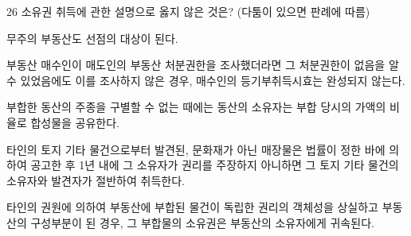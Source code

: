 \begin{question}{26}
소유권 취득에 관한 설명으로 옳지 않은 것은? (다툼이 있으면 판례에 따름)
\begin{choices}
  \item 무주의 부동산도 선점의 대상이 된다.
  \item 부동산 매수인이 매도인의 부동산 처분권한을 조사했더라면 그 처분권한이 없음을 알 수 있었음에도 이를 조사하지 않은 경우, 매수인의 등기부취득시효는 완성되지 않는다.
  \item 부합한 동산의 주종을 구별할 수 없는 때에는 동산의 소유자는 부합 당시의 가액의 비율로 합성물을 공유한다.
  \item 타인의 토지 기타 물건으로부터 발견된, 문화재가 아닌 매장물은 법률이 정한 바에 의하여 공고한 후 1년 내에 그 소유자가 권리를 주장하지 아니하면 그 토지 기타 물건의 소유자와 발견자가 절반하여 취득한다.
  \item 타인의 권원에 의하여 부동산에 부합된 물건이 독립한 권리의 객체성을 상실하고 부동산의 구성부분이 된 경우, 그 부합물의 소유권은 부동산의 소유자에게 귀속된다.
\end{choices}
\end{question}
